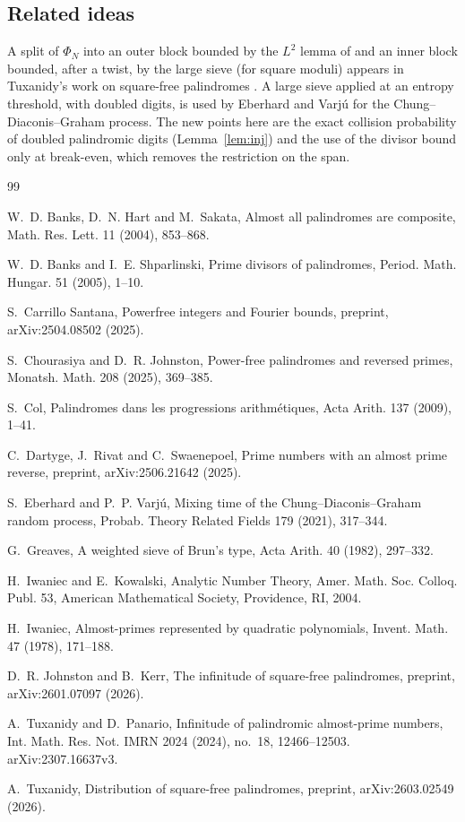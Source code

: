\documentclass[11pt]{amsart}
\theoremstyle{definition}
\numberwithin{equation}{section}
\begin{document}
\subsection{Related ideas}
A split of $\Phi_N$ into an outer block bounded by the $L^2$ lemma of \cite{TP} and an inner block bounded, after a twist, by the large sieve (for square moduli) appears in Tuxanidy's work on square-free palindromes \cite{Tux}. A large sieve applied at an entropy threshold, with doubled digits, is used by Eberhard and Varj\'u \cite{EV} for the Chung--Diaconis--Graham process. The new points here are the exact collision probability of doubled palindromic digits (Lemma~\ref{lem:inj}) and the use of the divisor bound only at break-even, which removes the restriction on the span.

\begin{thebibliography}{99}

W.~D. Banks, D.~N. Hart and M.~Sakata, Almost all palindromes are composite, Math. Res. Lett. 11 (2004), 853--868.

W.~D. Banks and I.~E. Shparlinski, Prime divisors of palindromes, Period. Math. Hungar. 51 (2005), 1--10.

S.~Carrillo Santana, Powerfree integers and Fourier bounds, preprint, arXiv:2504.08502 (2025).

S.~Chourasiya and D.~R. Johnston, Power-free palindromes and reversed primes, Monatsh. Math. 208 (2025), 369--385.

S.~Col, Palindromes dans les progressions arithm\'etiques, Acta Arith. 137 (2009), 1--41.

C.~Dartyge, J.~Rivat and C.~Swaenepoel, Prime numbers with an almost prime reverse, preprint, arXiv:2506.21642 (2025).

S.~Eberhard and P.~P. Varj\'u, Mixing time of the Chung--Diaconis--Graham random process, Probab. Theory Related Fields 179 (2021), 317--344.

G.~Greaves, A weighted sieve of Brun's type, Acta Arith. 40 (1982), 297--332.

H.~Iwaniec and E.~Kowalski, Analytic Number Theory, Amer. Math. Soc. Colloq. Publ. 53, American Mathematical Society, Providence, RI, 2004.

H.~Iwaniec, Almost-primes represented by quadratic polynomials, Invent. Math. 47 (1978), 171--188.

D.~R. Johnston and B.~Kerr, The infinitude of square-free palindromes, preprint, arXiv:2601.07097 (2026).

A.~Tuxanidy and D.~Panario, Infinitude of palindromic almost-prime numbers, Int. Math. Res. Not. IMRN 2024 (2024), no.~18, 12466--12503. arXiv:2307.16637v3.

A.~Tuxanidy, Distribution of square-free palindromes, preprint, arXiv:2603.02549 (2026).

\end{thebibliography}
\end{document}
